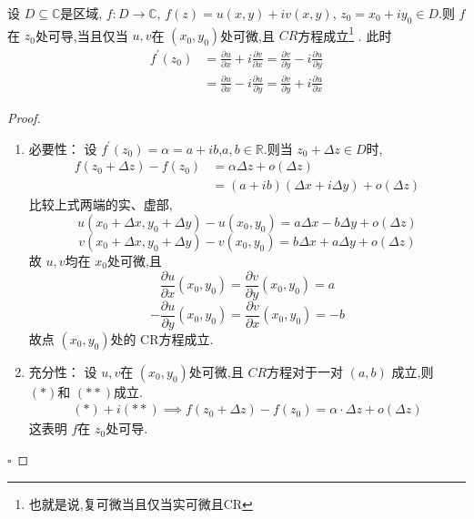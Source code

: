 \documentclass[../../复变函数.tex]{subfiles}
\begin{document}
\begin{theorem}
    设 \(  D\subseteq \mathbb{C}   \)是区域, \(  f:D\to \mathbb{C}   \), \(  f\left( z \right)= u\left( x,y \right)+ iv\left( x,y \right)     \), \(  z_0 =  x_0+ iy_0 \in D  \).则 \(  f  \)在 \(  z_0  \)处可导,当且仅当 \(  u,v  \)在 \(  \left( x_0,y_0 \right)   \)处可微,且 \(  CR  \)方程成立\footnote{也就是说,复可微当且仅当实可微且CR} .
    此时 \[
    \begin{aligned}
    f^{\prime} \left( z_0 \right)& = \frac{\partial u}{\partial x}+ i \frac{\partial v}{\partial x}=  \frac{\partial v}{\partial y}-i \frac{\partial u}{\partial y}\\ 
     &=  \frac{\partial u}{\partial x}-i\frac{\partial u}{\partial y}  = \frac{\partial v}{\partial y}+ i\frac{\partial u}{\partial x}
    \end{aligned} 
    \]         
\end{theorem}
\begin{proof}
    \begin{enumerate}
        \item 必要性：
        设 \(  f^{\prime} \left( z_0 \right)= \alpha = a+ ib   \),\(  a,b\in \mathbb{R}   \).则当 \(  z_0+  \Delta z \in D  \)时, \[
        \begin{aligned}
        f\left( z_0+  \Delta z \right)-f\left( z_0 \right)&= \alpha  \Delta z + o\left(  \Delta z \right)    \\ 
         & =  \left( a+ ib \right)\left(  \Delta x+ i \Delta y \right)+  o\left(  \Delta z \right)   
        \end{aligned}
        \]   比较上式两端的实、虚部, \[
        u\left( x_0+  \Delta x,y_0+  \Delta y \right)-u\left( x_0,y_0 \right)= a \Delta x-b \Delta y+ o\left(  \Delta z \right) \tag{*}   
        \] \[
        v\left( x_0+  \Delta x,y_0+  \Delta y \right) -v\left( x_0,y_0 \right) =  b \Delta x+ a \Delta y+ o\left(  \Delta z \right) \tag{**}   
        \]故 \(  u,v  \)均在 \(  x_0  \)处可微,且   \[
        \frac{\partial u}{\partial x}\left( x_0,y_0 \right)= \frac{\partial v}{\partial y} \left( x_0,y_0 \right)= a 
        \] \[
        -\frac{\partial u}{\partial y}\left( x_0,y_0 \right) = \frac{\partial v}{\partial x}\left( x_0,y_0 \right) = -b
        \]故点 \(  \left( x_0,y_0 \right)   \)处的 CR方程成立.
        \item 充分性：
        设 \(  u,v  \)在 \(  \left( x_0,y_0 \right)   \)处可微,且 \(  CR  \)方程对于一对 \(  \left( a,b \right)   \) 成立,则 \(  \left( * \right)   \)和 \(  \left( ** \right)   \)成立.     \[
        \begin{aligned}
        \left( * \right)+ i\left( ** \right) \implies f\left( z_0+  \Delta z \right)-f\left( z_0 \right) =  \alpha \cdot  \Delta z+ o\left(  \Delta z \right)      
        \end{aligned}
        \]这表明 \(  f  \)在 \(  z_0  \)处可导.  
    \end{enumerate}
    

    \hfill $\square$
\end{proof}
\end{document}
